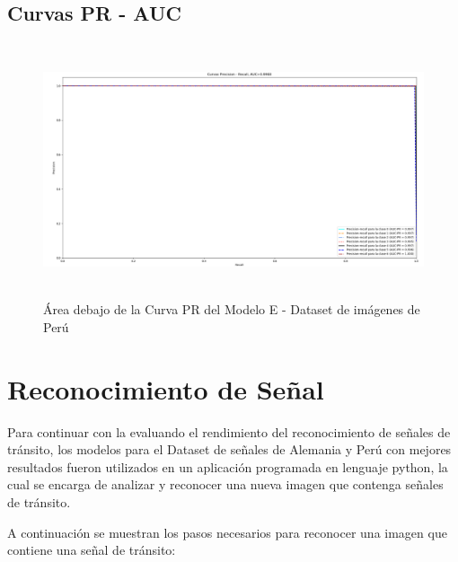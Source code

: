 		\subsection{Curvas PR - AUC}  
					\begin{figure}[H]
						\includegraphics[width=1\textwidth, height=7.5cm]{images/desarrollo/testResults/peru/PR_curve_modelE} 
						\begin{center}
						\caption{\small{Área debajo de la Curva PR del Modelo E - Dataset de imágenes de Perú}}
						{\small{\fontsize{10}{16.8}\selectfont {Fuente: Elaboración propia}}}
						\end{center}
						\vspace{-1.5em}
					\end{figure}
	\newpage
	
	
		
	\section{Reconocimiento de Señal}
		Para continuar con la evaluando el rendimiento del reconocimiento de señales de tránsito, los modelos para el Dataset de señales de Alemania y Perú con mejores resultados fueron utilizados en un aplicación programada en lenguaje python, la cual se encarga de analizar y reconocer una nueva imagen que contenga señales de tránsito.

		A continuación se muestran los pasos necesarios para reconocer una imagen que contiene una señal de tránsito:

